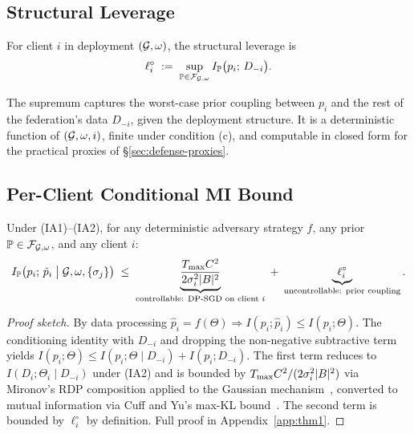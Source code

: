\subsection{Structural Leverage}
\label{sec:defense-leverage}

\begin{definition}
\label{def:leverage}
For client $i$ in deployment $(\mathcal{G},\omega)$, the structural leverage is
\[
\ell_i^\circ \;:=\; \sup_{\mathbb{P} \in \mathcal{F}_{\mathcal{G},\omega}}
                     I_{\mathbb{P}}\big(p_i;\, D_{-i}\big).
\]
\end{definition}

The supremum captures the worst-case prior coupling between $p_i$ and
the rest of the federation's data $D_{-i}$, given the deployment
structure. It is a deterministic function of $(\mathcal{G},\omega,i)$, finite
under condition (c), and computable in closed form for the practical
proxies of \S\ref{sec:defense-proxies}.

\subsection{Per-Client Conditional MI Bound}
\label{sec:defense-thm1}

\begin{theorem}
\label{thm:per-client}
Under (IA1)--(IA2), for any deterministic adversary strategy $f$,
any prior $\mathbb{P} \in \mathcal{F}_{\mathcal{G},\omega}$, and any client $i$:
\begin{equation}
I_{\mathbb{P}}\big(p_i;\,\hat p_i \;\big|\; \mathcal{G},\omega,\{\sigma_j\}\big)
\;\leq\;
\underbrace{\frac{T_{\max} C^2}{2\sigma_i^2 |B|^2}}_{\text{controllable: DP-SGD on client } i}
\;+\;
\underbrace{\ell_i^\circ}_{\text{uncontrollable: prior coupling}}.
\label{eq:thm1}
\end{equation}
\end{theorem}

\begin{proof}[Proof sketch]
By data processing $\hat p_i = f(\Theta) \Rightarrow I(p_i;\hat p_i) \leq I(p_i;\Theta)$.
The conditioning identity with $D_{-i}$ and dropping the non-negative
subtractive term yields
$I(p_i;\Theta) \leq I(p_i;\Theta \mid D_{-i}) + I(p_i;D_{-i})$. The first
term reduces to $I(D_i;\Theta_i \mid D_{-i})$ under (IA2) and is bounded
by $T_{\max} C^2/(2\sigma_i^2 |B|^2)$ via Mironov's RDP composition
\cite{mironov2017rdp} applied to the Gaussian
mechanism~\cite{abadi2016dpsgd}, converted to mutual information via
Cuff and Yu's max-KL bound~\cite{cuff2016mi}. The second term is bounded
by $\ell_i^\circ$ by definition. Full proof in Appendix~\ref{app:thm1}.
\end{proof}

